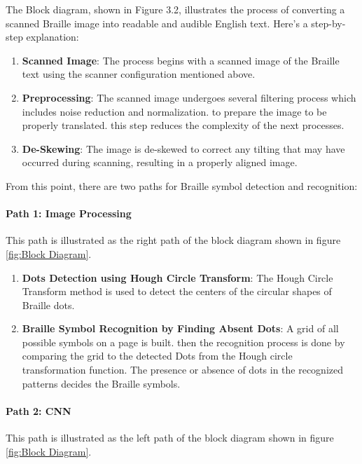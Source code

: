 \newpage
The Block diagram, shown in Figure 3.2, illustrates the process of converting a scanned Braille image into readable and audible English text. Here's a step-by-step explanation:

\begin{enumerate}
    \item \textbf{Scanned Image}: The process begins with a scanned image of the Braille text using the scanner configuration mentioned above.

    \item \textbf{Preprocessing}: The scanned image undergoes several  filtering process which includes noise reduction and normalization. to prepare the image to be properly translated. this step reduces the complexity of  the next processes.

    \item \textbf{De-Skewing}: The image is de-skewed to correct any tilting that may have occurred during scanning, resulting in a properly aligned image.\\

\end{enumerate}
From this point, there are two paths for Braille symbol detection and recognition:\\

\paragraph{Path 1: Image Processing }
This path is illustrated as the right path of the block diagram shown in figure \ref{fig:Block Diagram}.

\begin{enumerate}
    \item \textbf{Dots Detection using Hough Circle Transform}: The Hough Circle Transform method is used to detect the centers of the circular shapes of Braille dots.

    \item \textbf{Braille Symbol Recognition by Finding Absent Dots}: A grid of all  possible symbols on a page is built. then the recognition process is done by comparing the grid to the detected Dots from the Hough circle transformation function. The presence or absence of dots in the recognized patterns decides  the Braille symbols.
\end{enumerate}

\paragraph{Path 2: CNN }
This path is illustrated as the left path of the block diagram shown in figure \ref{fig:Block Diagram}.

